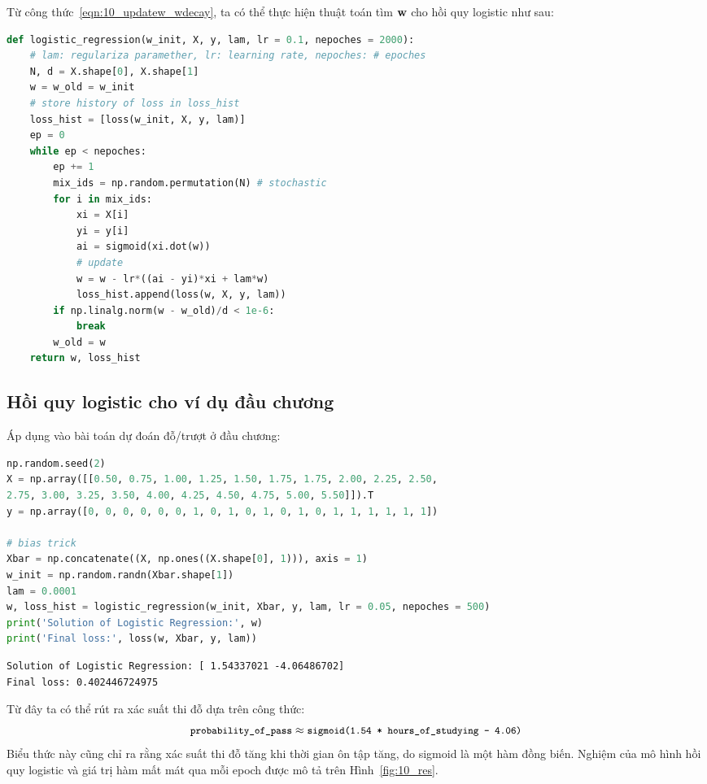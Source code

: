 Từ công thức~\eqref{eqn:10_updatew_wdecay}, ta có thể thực hiện thuật toán tìm $\mathbf{w}$ cho hồi quy logistic như sau:
\newpage

\begin{lstlisting}[language=Python]
def logistic_regression(w_init, X, y, lam, lr = 0.1, nepoches = 2000):
    # lam: regulariza paramether, lr: learning rate, nepoches: # epoches
    N, d = X.shape[0], X.shape[1]
    w = w_old = w_init
    # store history of loss in loss_hist
    loss_hist = [loss(w_init, X, y, lam)]
    ep = 0
    while ep < nepoches:
        ep += 1
        mix_ids = np.random.permutation(N) # stochastic
        for i in mix_ids:
            xi = X[i]
            yi = y[i]
            ai = sigmoid(xi.dot(w))
            # update
            w = w - lr*((ai - yi)*xi + lam*w)
            loss_hist.append(loss(w, X, y, lam))
        if np.linalg.norm(w - w_old)/d < 1e-6:
            break
        w_old = w
    return w, loss_hist
\end{lstlisting}

\subsection{Hồi quy logistic cho ví dụ đầu chương}
Áp dụng vào bài toán dự đoán đỗ/trượt ở đầu chương:
\begin{lstlisting}[language=Python]
np.random.seed(2)
X = np.array([[0.50, 0.75, 1.00, 1.25, 1.50, 1.75, 1.75, 2.00, 2.25, 2.50,
2.75, 3.00, 3.25, 3.50, 4.00, 4.25, 4.50, 4.75, 5.00, 5.50]]).T
y = np.array([0, 0, 0, 0, 0, 0, 1, 0, 1, 0, 1, 0, 1, 0, 1, 1, 1, 1, 1, 1])

# bias trick
Xbar = np.concatenate((X, np.ones((X.shape[0], 1))), axis = 1)
w_init = np.random.randn(Xbar.shape[1])
lam = 0.0001
w, loss_hist = logistic_regression(w_init, Xbar, y, lam, lr = 0.05, nepoches = 500)
print('Solution of Logistic Regression:', w)
print('Final loss:', loss(w, Xbar, y, lam))
\end{lstlisting}
\kq
\begin{lstlisting}
Solution of Logistic Regression: [ 1.54337021 -4.06486702]
Final loss: 0.402446724975
\end{lstlisting}

Từ đây ta có thể rút ra xác suất thi đỗ dựa trên công thức:
\begin{equation*}
\small
\text{\texttt{probability\_of\_pass}} \approx \texttt{sigmoid(1.54
* hours\_of\_studying - 4.06)}
\end{equation*}
Biểu thức này cũng chỉ ra rằng xác suất thi đỗ tăng khi thời gian ôn tập
tăng, do sigmoid là một hàm đồng biến. Nghiệm của mô hình hồi quy logistic
và giá trị hàm mất mát qua mỗi epoch được mô tả trên Hình~\ref{fig:10_res}.


